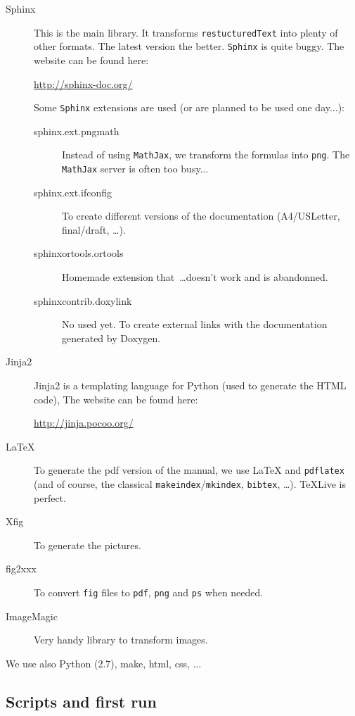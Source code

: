 \documentclass[a4paper,10pt]{article}
\newcommand{\code}[1]{\texttt{#1}}
\begin{document}
\begin{description}
 \item[Sphinx] This is the main library. It transforms \verb+restucturedText+ into plenty of other formats. The latest version the better. \code{Sphinx} is quite buggy. The website can be found here:

\href{http://sphinx-doc.org/}{http://sphinx-doc.org/}

Some \code{Sphinx} extensions are used (or are planned to be used one day...):
 \begin{description}
\item[sphinx.ext.pngmath] Instead of using \code{MathJax}, we transform the formulas into \code{png}. The \code{MathJax} server is often too busy...
\item[sphinx.ext.ifconfig] To create different versions of the documentation (A4/USLetter, final/draft, \ldots).
\item[sphinxortools.ortools] Homemade extension that~\ldots doesn't work and is abandonned.
\item[sphinxcontrib.doxylink] No used yet. To create external links with the documentation generated by Doxygen.
\end{description}

\item[Jinja2] Jinja2 is a templating language for Python (used to generate the HTML code), The website can be found here:

\href{http://jinja.pocoo.org/}{http://jinja.pocoo.org/}

 \item[\LaTeX] To generate the pdf version of the manual, we use \LaTeX{} and \verb+pdflatex+ (and of course, the classical \verb+makeindex+/\verb+mkindex+, \verb+bibtex+, \ldots). \TeX Live is perfect.

\item[Xfig] To generate the pictures.

\item[fig2xxx] To convert \code{fig} files to \code{pdf}, \code{png} and \code{ps} when needed.

\item[ImageMagic] Very handy library to transform images.

 \end{description}

We use also Python (2.7), make, html, css, ...

\subsection{Scripts and first run}
\end{document}
